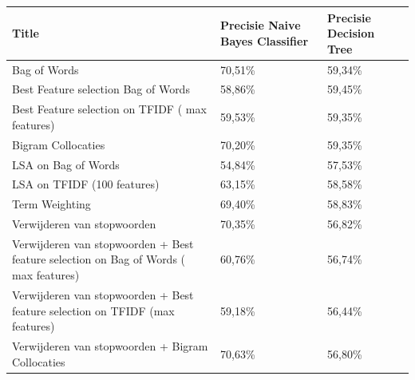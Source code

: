 \begin{table}[h]
\centering
\begin{adjustbox}{width=1\textwidth}
\begin{tabular}{|l|l|l|}
\hline
{\bf Title}                                                                          & {\bf Precisie Naive Bayes Classifier} & {\bf Precisie Decision Tree} \\ \hline
Bag of Words                                                                         & 70,51\%                               & 59,34\%                      \\ \hline
Best Feature selection Bag of Words                                                  & 58,86\%                               & 59,45\%                      \\ \hline
Best Feature selection on TFIDF ( max features)                                      & 59,53\%                               & 59,35\%                      \\ \hline
Bigram Collocaties                                                                   & 70,20\%                               & 59,35\%                      \\ \hline
LSA on Bag of Words                                                                  & 54,84\%                               & 57,53\%                      \\ \hline
LSA on TFIDF (100 features)                                                          & 63,15\%                               & 58,58\%                      \\ \hline
Term Weighting                                                                       & 69,40\%                               & 58,83\%                      \\ \hline
Verwijderen van stopwoorden                                                          & 70,35\%                               & 56,82\%                      \\ \hline
Verwijderen van stopwoorden + Best feature selection on Bag of Words ( max features) & 60,76\%                               & 56,74\%                      \\ \hline
Verwijderen van stopwoorden + Best feature selection on TFIDF (max features)         & 59,18\%                               & 56,44\%                      \\ \hline
Verwijderen van stopwoorden + Bigram Collocaties                                     & 70,63\%                               & 56,80\%                      \\ \hline

\end{tabular}
\end{adjustbox}
\end{table}

